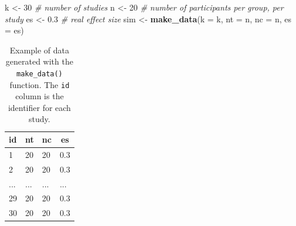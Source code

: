 \documentclass[
  man,floatsintext]{apa6}
\newenvironment{Shaded}{\begin{snugshade}}{\end{snugshade}}
\newcommand{\AttributeTok}[1]{\textcolor[rgb]{0.13,0.29,0.53}{#1}}
\newcommand{\CommentTok}[1]{\textcolor[rgb]{0.56,0.35,0.01}{\textit{#1}}}
\newcommand{\DecValTok}[1]{\textcolor[rgb]{0.00,0.00,0.81}{#1}}
\newcommand{\FloatTok}[1]{\textcolor[rgb]{0.00,0.00,0.81}{#1}}
\newcommand{\FunctionTok}[1]{\textcolor[rgb]{0.13,0.29,0.53}{\textbf{#1}}}
\newcommand{\NormalTok}[1]{#1}
\newcommand{\OtherTok}[1]{\textcolor[rgb]{0.56,0.35,0.01}{#1}}
\begin{document}
\scriptsize

\begin{Shaded}
\begin{Highlighting}[]
\NormalTok{k }\OtherTok{\textless{}{-}} \DecValTok{30} \CommentTok{\# number of studies}
\NormalTok{n }\OtherTok{\textless{}{-}} \DecValTok{20} \CommentTok{\# number of participants per group, per study}
\NormalTok{es }\OtherTok{\textless{}{-}} \FloatTok{0.3} \CommentTok{\# real effect size}
\NormalTok{sim }\OtherTok{\textless{}{-}} \FunctionTok{make\_data}\NormalTok{(}\AttributeTok{k =}\NormalTok{ k, }\AttributeTok{nt =}\NormalTok{ n, }\AttributeTok{nc =}\NormalTok{ n, }\AttributeTok{es =}\NormalTok{ es)}
\end{Highlighting}
\end{Shaded}

\normalsize

\scriptsize

\begin{table}[H]

\begin{center}
\begin{threeparttable}

\caption{\label{tab:sim-data-example-tab}Example of data generated with the \texttt{make\_data()} function. The \texttt{id} column is the identifier for each study.}

\small{

\begin{tabular}{llll}
\toprule
id & \multicolumn{1}{c}{nt} & \multicolumn{1}{c}{nc} & \multicolumn{1}{c}{es}\\
\midrule
1 & 20 & 20 & 0.3\\
2 & 20 & 20 & 0.3\\
... & ... & ... & ...\\
29 & 20 & 20 & 0.3\\
30 & 20 & 20 & 0.3\\
\bottomrule
\end{tabular}

}

\end{threeparttable}
\end{center}

\end{table}

\normalsize

\color{red}

\scriptsize
\end{document}
